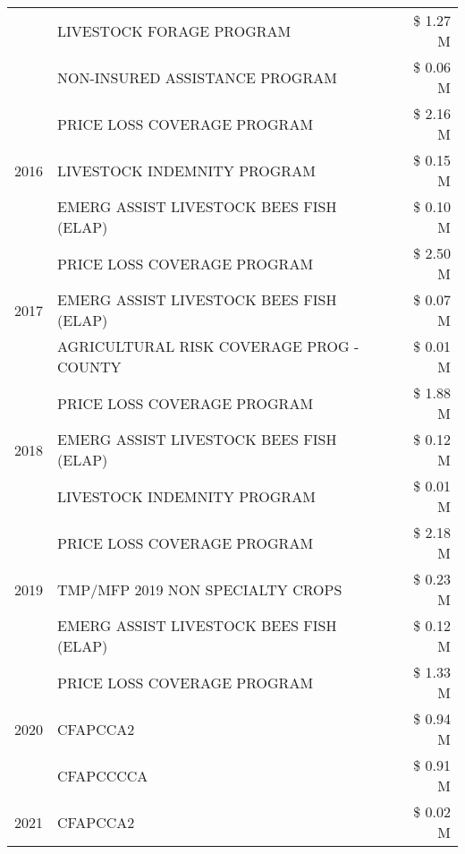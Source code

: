 \begin{tabular}{llr}
 & LIVESTOCK FORAGE PROGRAM & \$ 1.27 M \\
 & NON-INSURED ASSISTANCE PROGRAM & \$ 0.06 M \\
\cline{1-3}
\multirow[t]{3}{*}{2016} & PRICE LOSS COVERAGE PROGRAM & \$ 2.16 M \\
 & LIVESTOCK INDEMNITY PROGRAM & \$ 0.15 M \\
 & EMERG ASSIST LIVESTOCK BEES FISH (ELAP) & \$ 0.10 M \\
\cline{1-3}
\multirow[t]{3}{*}{2017} & PRICE LOSS COVERAGE PROGRAM & \$ 2.50 M \\
 & EMERG ASSIST LIVESTOCK BEES FISH (ELAP) & \$ 0.07 M \\
 & AGRICULTURAL RISK COVERAGE PROG - COUNTY & \$ 0.01 M \\
\cline{1-3}
\multirow[t]{3}{*}{2018} & PRICE LOSS COVERAGE PROGRAM & \$ 1.88 M \\
 & EMERG ASSIST LIVESTOCK BEES FISH (ELAP) & \$ 0.12 M \\
 & LIVESTOCK INDEMNITY PROGRAM & \$ 0.01 M \\
\cline{1-3}
\multirow[t]{3}{*}{2019} & PRICE LOSS COVERAGE PROGRAM & \$ 2.18 M \\
 & TMP/MFP 2019 NON SPECIALTY CROPS & \$ 0.23 M \\
 & EMERG ASSIST LIVESTOCK BEES FISH (ELAP) & \$ 0.12 M \\
\cline{1-3}
\multirow[t]{3}{*}{2020} & PRICE LOSS COVERAGE PROGRAM & \$ 1.33 M \\
 & CFAPCCA2 & \$ 0.94 M \\
 & CFAPCCCCA & \$ 0.91 M \\
\cline{1-3}
2021 & CFAPCCA2 & \$ 0.02 M \\
\cline{1-3}
\bottomrule
\end{tabular}
